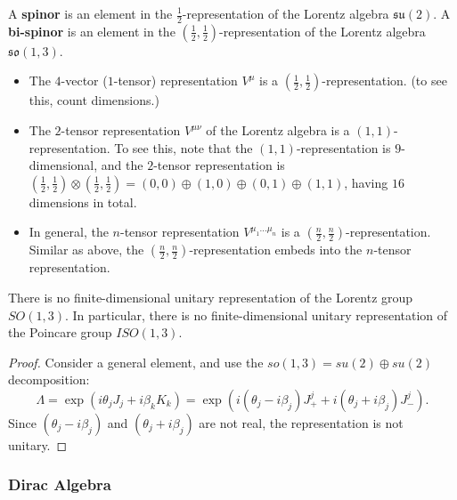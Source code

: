\begin{definition}
\label{def:spinor}
A \textbf{spinor} is an element in the $\frac{1}{2}$-representation of the Lorentz algebra $\mathfrak{su}(2)$. A \textbf{bi-spinor} is an element in the $(\frac{1}{2}, \frac{1}{2})$-representation of the Lorentz algebra $\mathfrak{so}(1,3)$.
\end{definition}

\begin{example}
    \begin{itemize}
        \item The $4$-vector ($1$-tensor) representation $V^\mu$ is a $(\frac{1}{2}, \frac{1}{2})$-representation. (to see this, count dimensions.)
        \item The $2$-tensor representation $V^{\mu \nu}$ of the Lorentz algebra is a $(1,1)$-representation. 
        To see this, note that the $(1,1)$-representation is $9$-dimensional, and the $2$-tensor representation is $(\frac{1}{2}, \frac{1}{2}) \otimes (\frac{1}{2}, \frac{1}{2}) =
    (0,0) \oplus(1,0) \oplus(0,1) \oplus(1,1)$, having $16$ dimensions in total.
        \item In general, the $n$-tensor representation $V^{\mu_1 \ldots \mu_n}$ is a $(\frac{n}{2}, \frac{n}{2})$-representation.
        Similar as above, the $(\frac{n}{2}, \frac{n}{2})$-representation embeds into the $n$-tensor representation.
    \end{itemize}
\end{example}

\begin{fact}
    There is no finite-dimensional unitary representation of the Lorentz group $SO(1,3)$. In particular, there is no finite-dimensional unitary representation of the Poincare group $ISO(1,3)$.
\end{fact}
\begin{proof}
    Consider a general element, and use the $so(1,3) = su(2) \oplus su(2)$ decomposition:
    \[
    \Lambda = \exp(i \theta_j J_j + i \beta_k K_k) = \exp(i (\theta_j - i \beta_j) J_+^j + i (\theta_j + i \beta_j) J_-^j).
    \]
    Since $(\theta_j - i \beta_j)$ and $(\theta_j + i \beta_j)$ are not real, the representation is not unitary.
\end{proof}

\subsubsection{Dirac Algebra}




